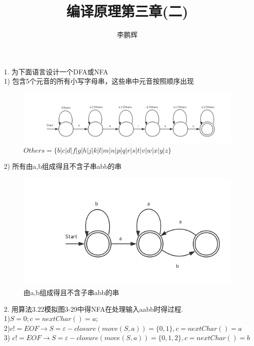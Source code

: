 \documentclass[a4paper, 16pt]{article}
\title{编译原理第三章(二)}
\author{李鹏辉}
\begin{document}
\maketitle


1. 为下面语言设计一个DFA或NFA\\


1) 包含5个元音的所有小写字母串，这些串中元音按照顺序出现\\
\begin{figure}[H]
\centering
\includegraphics[scale = 0.6]{chapter3_hw2_1}
\caption{$Others = \{b | c |d | f| g| h | j | k | l | m | n| p | q | r| s| t| v| w| x| y|z \}$}
\label{f1}
\end{figure}
2) 所有由a,b组成得且不含子串abb的串\\
\begin{figure}[H]
\centering
\includegraphics[scale = 0.6]{chapter3_hw2_2}
\caption{由a,b组成得且不含子串abb的串}
\label{f1}
\end{figure}
2. 用算法3.22模拟图3-29中得NFA在处理输入aabb时得过程.\\

	1)$S={0}; c = nextChar()  = a;$\\
	
	2)$c!= EOF \rightarrow S = \varepsilon-closure(move(S,a)) = \{0, 1\}, c = nextChar() = a$\\
	
	3) $c!= EOF \rightarrow S= \varepsilon-closure(move(S,a)) = \{0, 1, 2\}, c = nextChar() = b$\\
	
\end{document}
